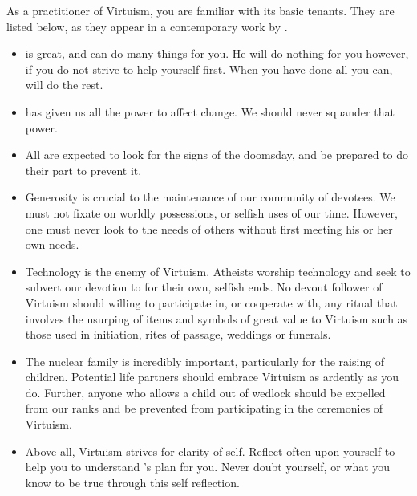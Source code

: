 \documentclass[blue]{guildcamp1}
\begin{document}
\name{\bVirtuism{}}

As a practitioner of Virtuism, you are familiar with its basic tenants. They are listed below, as they appear in a contemporary work by \cPastor{\MYname{}}.

\begin{itemize}
  \item \cGod{\MYname{}} is great, and can do many things for you. He will do nothing for you however, if you do not strive to help yourself first. When you have done all you can, \cGod{\MYname{}} will do the rest.
  
  \item \cGod{\MYname{}} has given us all the power to affect change. We should never squander that power. 
  
  \item All are expected to look for the signs of the doomsday, and be prepared to do their part to prevent it. 
  
  \item Generosity is crucial to the maintenance of our community of devotees. We must not fixate on worldly possessions, or selfish uses of our time. However, one must never look to the needs of others without first meeting his or her own needs.
  
  \item Technology is the enemy of Virtuism. Atheists worship technology and seek to subvert our devotion to \cGod{\MYname{}} for their own, selfish ends. No devout follower of Virtuism should willing to participate in, or cooperate with, any ritual that involves the usurping of items and symbols of great value to Virtuism such as those used in initiation, rites of passage, weddings or funerals.
  
  \item The nuclear family is incredibly important, particularly for the raising of children. Potential life partners should embrace Virtuism as ardently as you do. Further, anyone who allows a child out of wedlock should be expelled from our ranks and be prevented from participating in the ceremonies of Virtuism.
  
  \item Above all, Virtuism strives for clarity of self. Reflect often upon yourself to help you to understand \cGod{\MYname{}}'s plan for you. Never doubt yourself, or what you know to be true through this self reflection.
\end{itemize}
\end{document}
